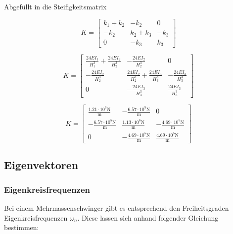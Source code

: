 \documentclass[
  letterpaper,
  DIV=11]{scrreprt}
\begin{document}
Abgefüllt in die Steifigkeitsmatrix

\begin{equation}K = \left[\begin{matrix}k_{1} + k_{2} & - k_{2} & 0\\- k_{2} & k_{2} + k_{3} & - k_{3}\\0 & - k_{3} & k_{3}\end{matrix}\right]\end{equation}

\begin{equation}K = \left[\begin{matrix}\frac{24 EI_{1}}{H_{1}^{3}} + \frac{24 EI_{2}}{H_{2}^{3}} & - \frac{24 EI_{2}}{H_{2}^{3}} & 0\\- \frac{24 EI_{2}}{H_{2}^{3}} & \frac{24 EI_{2}}{H_{2}^{3}} + \frac{24 EI_{3}}{H_{3}^{3}} & - \frac{24 EI_{3}}{H_{3}^{3}}\\0 & - \frac{24 EI_{3}}{H_{3}^{3}} & \frac{24 EI_{3}}{H_{3}^{3}}\end{matrix}\right]\end{equation}

\begin{equation}K = \left[\begin{matrix}\frac{1.21 \cdot 10^{6} \text{N}}{\text{m}} & - \frac{6.57 \cdot 10^{5} \text{N}}{\text{m}} & 0\\- \frac{6.57 \cdot 10^{5} \text{N}}{\text{m}} & \frac{1.13 \cdot 10^{6} \text{N}}{\text{m}} & - \frac{4.69 \cdot 10^{5} \text{N}}{\text{m}}\\0 & - \frac{4.69 \cdot 10^{5} \text{N}}{\text{m}} & \frac{4.69 \cdot 10^{5} \text{N}}{\text{m}}\end{matrix}\right]\end{equation}

\hypertarget{eigenvektoren-3}{%
\subsection{Eigenvektoren}\label{eigenvektoren-3}}

\hypertarget{eigenkreisfrequenzen-4}{%
\subsubsection{Eigenkreisfrequenzen}\label{eigenkreisfrequenzen-4}}

Bei einem Mehrmassenschwinger gibt es entsprechend den Freiheitsgraden
Eigenkreisfrequenzen \(\omega_n\). Diese lassen sich anhand folgender
Gleichung bestimmen:
\end{document}
